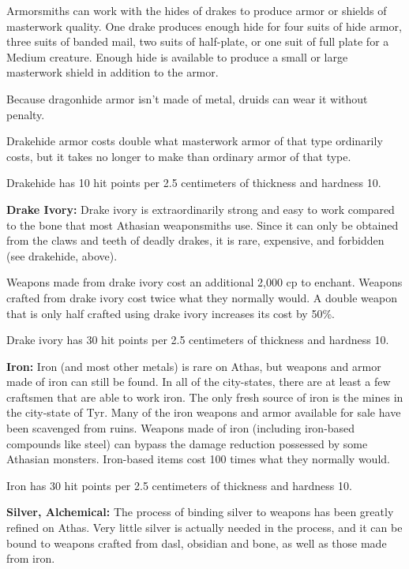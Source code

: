 Armorsmiths can work with the hides of drakes to produce armor or shields of masterwork quality. One drake produces enough hide for four suits of hide armor, three suits of banded mail, two suits of half-plate, or one suit of full plate for a Medium creature. Enough hide is available to produce a small or large masterwork shield in addition to the armor.

Because dragonhide armor isn't made of metal, druids can wear it without penalty.

Drakehide armor costs double what masterwork armor of that type ordinarily costs, but it takes no longer to make than ordinary armor of that type.

Drakehide has 10 hit points per 2.5 centimeters of thickness and hardness 10.

\textbf{Drake Ivory:} Drake ivory is extraordinarily strong and easy to work compared to the bone that most Athasian weaponsmiths use. Since it can only be obtained from the claws and teeth of deadly drakes, it is rare, expensive, and forbidden (see drakehide, above).

Weapons made from drake ivory cost an additional 2,000 cp to enchant. Weapons crafted from drake ivory cost twice what they normally would. A double weapon that is only half crafted using drake ivory increases its cost by 50\%.

Drake ivory has 30 hit points per 2.5 centimeters of thickness and hardness 10.


\textbf{Iron:} Iron (and most other metals) is rare on Athas, but weapons and armor made of iron can still be found. In all of the city-states, there are at least a few craftsmen that are able to work iron. The only fresh source of iron is the mines in the city-state of Tyr. Many of the iron weapons and armor available for sale have been scavenged from ruins. Weapons made of iron (including iron-based compounds like steel) can bypass the damage reduction possessed by some Athasian monsters. Iron-based items cost 100 times what they normally would.

Iron has 30 hit points per 2.5 centimeters of thickness and hardness 10.

\textbf{Silver, Alchemical:} The process of binding silver to weapons has been greatly refined on Athas. Very little silver is actually needed in the process, and it can be bound to weapons crafted from dasl, obsidian and bone, as well as those made from iron.

